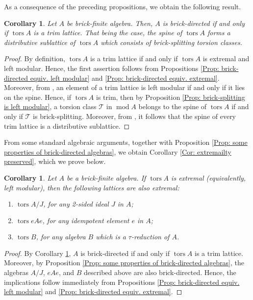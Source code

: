 \documentclass{amsart}
\theoremstyle{thmstyle}
\newtheorem{corollary}[thm]{Corollary}
\theoremstyle{exstyle}
\theoremstyle{defstyle}
\theoremstyle{remstyle}
\theoremstyle{remstyle}
\DeclareMathOperator*{\modu}{mod}
\DeclareMathOperator*{\tors}{tors}
\begin{document}
As a consequence of the preceding propositions, we obtain the following result.

\begin{corollary}\label{Cor: brick-directed equiv. trim}
Let $A$ be brick-finite algebra. Then, $A$ is brick-directed if and only if $\tors A$ is a trim lattice. That being the case, the spine of $\tors A$ forms a distributive sublattice of $\tors A$ which consists of brick-splitting torsion classes.
\end{corollary}
\begin{proof}
By definition, $\tors A$ is a trim lattice if and only if $\tors A$ is extremal and left modular. Hence, the first assertion follows from Propositions \ref{Prop: brick-directed equiv. left modular}
and \ref{Prop: brick-directed equiv. extremal}. Moreover, from \cite[Theorem 3.7]{TW}, an element of a trim lattice is left modular if and only if it lies on the spine. 
Hence, if $\tors A$ is trim, then by Proposition \ref{Prop: brick-splitting is left modular}, a torsion class $\mathcal{T}$ in $\modu A$ belongs to the spine of $\tors A$ if and only if $\mathcal{T}$ is brick-splitting. Moreover, from \cite[Lemma 7]{Th}, it follows that the spine of every trim lattice is a distributive sublattice.
\end{proof} 

From some standard algebraic arguments, together with Proposition \ref{Prop: some properties of brick-directed algebras}, we obtain Corollary \ref{Cor: extremailty preserved}, which we prove below.

\begin{corollary}\label{Cor: quotien, corner and tau-reduction of extremal lattices}
Let $A$ be a brick-finite algebra. If $\tors A$ is extremal  (equivalently, left modular), then the following lattices are also extremal:
\begin{enumerate}
    \item $\tors A/J$, for any 2-sided ideal $J$ in $A$;
    \item $\tors eAe$, for any idempotent element $e$ in $A$;
    \item $\tors B$, for any algebra $B$ which is a $\tau$-reduction of $A$.
\end{enumerate}
\end{corollary}
\begin{proof}
By Corollary \ref{Cor: brick-directed equiv. trim}, $A$ is brick-directed if and only if $\tors A$ is a trim lattice. Moreover, by Proposition \ref{Prop: some properties of brick-directed algebras}, the algebras $A/J$, $eAe$, and $B$ described above are also brick-directed. Hence, the implications follow immediately from Propositions \ref{Prop: brick-directed equiv. left modular} and  \ref{Prop: brick-directed equiv. extremal}.
\end{proof}
\end{document}
